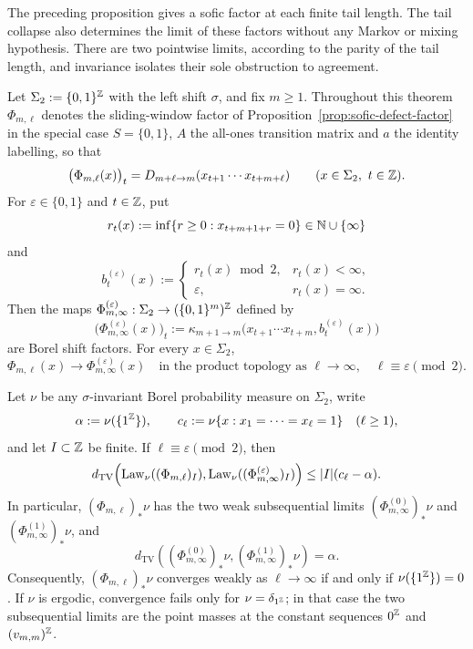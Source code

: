 The preceding proposition gives a sofic factor at each finite tail length.
The tail collapse also determines the limit of these factors without any
Markov or mixing hypothesis.  There are two pointwise limits, according to
the parity of the tail length, and invariance isolates their sole obstruction
to agreement.

\begin{theorem}
\label{thm:infinite-tail-factor}
Let $\Sigma_2:=\{0,1\}^{\mathbb{Z}}$ with the left shift $\sigma$, and fix $m\ge 1$.
Throughout this theorem $\Phi_{m,\ell}$ denotes the sliding-window factor of
Proposition~\ref{prop:sofic-defect-factor} in the special case $S=\{0,1\}$,
$A$ the all-ones transition matrix and $a$ the identity labelling, so that
\[
\bigl(\Phi_{m,\ell}(x)\bigr)_t
=
D_{m+\ell\to m}(x_{t+1}\cdots x_{t+m+\ell})
\qquad (x\in\Sigma_2,\ t\in\mathbb{Z}).
\]
For $\varepsilon\in\{0,1\}$ and $t\in\mathbb{Z}$, put
\[
r_t(x):=\inf\{r\ge 0:x_{t+m+1+r}=0\}\in\mathbb{N}\cup\{\infty\}
\]
and
\[
b_t^{(\varepsilon)}(x):=
\begin{cases}
r_t(x)\bmod 2,&r_t(x)<\infty,\\
\varepsilon,&r_t(x)=\infty.
\end{cases}
\]
Then the maps $\Phi_{m,\infty}^{(\varepsilon)}:\Sigma_2\to
(\{0,1\}^m)^{\mathbb{Z}}$ defined by
\[
\bigl(\Phi_{m,\infty}^{(\varepsilon)}(x)\bigr)_t
:=
\kappa_{m+1\to m}
\bigl(x_{t+1}\cdots x_{t+m},b_t^{(\varepsilon)}(x)\bigr)
\]
are Borel shift factors.  For every $x\in\Sigma_2$,
\[
\Phi_{m,\ell}(x)\longrightarrow\Phi_{m,\infty}^{(\varepsilon)}(x)
\quad\text{in the product topology as }\ell\to\infty,
\quad \ell\equiv\varepsilon\pmod 2.
\]

Let $\nu$ be any $\sigma$-invariant Borel probability measure on $\Sigma_2$,
write
\[
\alpha:=\nu(\{1^{\mathbb{Z}}\}),
\qquad
c_\ell:=\nu\{x:x_1=\cdots=x_\ell=1\}\quad(\ell\ge 1),
\]
and let $I\subset\mathbb{Z}$ be finite.  If $\ell\equiv\varepsilon\pmod 2$, then
\[
d_{\mathrm{TV}}\!\left(
\operatorname{Law}_\nu((\Phi_{m,\ell})_I),
\operatorname{Law}_\nu((\Phi_{m,\infty}^{(\varepsilon)})_I)
\right)
\le |I|(c_\ell-\alpha).
\]
In particular, $(\Phi_{m,\ell})_*\nu$ has the two weak subsequential limits
$(\Phi_{m,\infty}^{(0)})_*\nu$ and
$(\Phi_{m,\infty}^{(1)})_*\nu$, and
\[
d_{\mathrm{TV}}\!\left(
(\Phi_{m,\infty}^{(0)})_*\nu,
(\Phi_{m,\infty}^{(1)})_*\nu
\right)=\alpha.
\]
Consequently, $(\Phi_{m,\ell})_*\nu$ converges weakly as
$\ell\to\infty$ if and only if $\nu(\{1^{\mathbb{Z}}\})=0$.  If $\nu$ is ergodic,
convergence fails only for $\nu=\delta_{1^{\mathbb{Z}}}$; in that case the two
subsequential limits are the point masses at the constant sequences
$0^{\mathbb{Z}}$ and $(v_{m,m})^{\mathbb{Z}}$.
\end{theorem}

